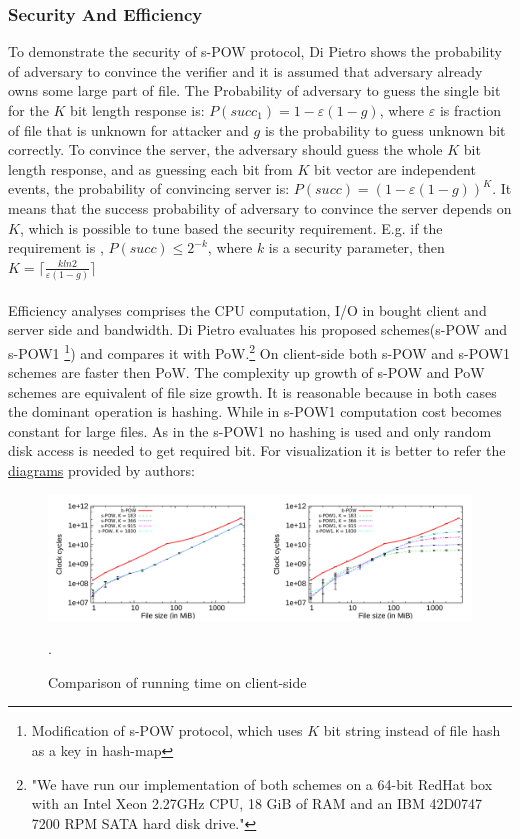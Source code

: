 \documentclass[12pt]{article}
\begin{document}
\subsubsection{Security And Efficiency}
\label{subsub:secAndeff2}

To demonstrate the security of s-POW protocol, Di Pietro shows the probability of adversary to convince the verifier and it is assumed that adversary already owns some large part of file. The Probability of adversary to guess the single bit for the $K$ bit length response is: $P(succ_1) = 1-\varepsilon(1-g)$, where $\varepsilon$ is fraction of file that is unknown for attacker and $g$ is the probability to guess unknown bit correctly. To convince the server, the adversary should guess the whole $K$ bit length response, and as guessing each bit from $K$ bit vector are independent events, the probability of convincing server is: $P(succ) = (1-\varepsilon(1-g))^K$. It means that the success probability  of adversary to convince the server depends on $K$, which is possible to tune based the security requirement. E.g. if the requirement is , $P(succ)\leq2^{-k}$, where $k$ is a security parameter, then $K =\lceil \frac{k ln 2}{\varepsilon(1-g)} \rceil $\\\\
Efficiency analyses comprises  the CPU computation, I/O  in bought client and server side and bandwidth. Di Pietro evaluates his proposed schemes(s-POW and s-POW1 \footnote{Modification of s-POW protocol, which uses $K$ bit string  instead of file hash as a key in hash-map}) and compares it with PoW.\footnote{"We have run our implementation of both schemes on a 64-bit RedHat box with an Intel Xeon 2.27GHz CPU, 18 GiB of RAM and an IBM 42D0747 7200 RPM SATA hard disk drive."}\cite{PoW} On client-side both s-POW and s-POW1 schemes are faster then PoW. The complexity up growth of s-POW and PoW schemes are equivalent of file size growth. It is reasonable because in both cases the dominant operation is hashing. While in s-POW1 computation cost becomes  constant for large files. As in the s-POW1 no hashing is used and only random disk access is needed to get required bit. For  visualization it is better to refer  the \hyperref[fig:POWvsPoW]{diagrams} provided by authors:
\begin{figure}[ht] 
\begin{center}
\includegraphics[width=1.0\textwidth]{POWvsPoW}
\caption{Comparison of running time on client-side}
\label{fig:POWvsPoW} .
\end{center}
\end{figure}
\end{document}
